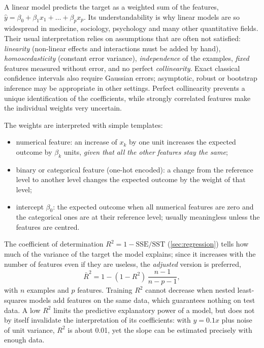 A linear model predicts the target as a weighted sum of the features,
$\hat y=\beta_0+\beta_1x_1+\dots+\beta_px_p$. Its understandability is why linear models are so
widespread in medicine, sociology, psychology and many other quantitative fields. Their usual
interpretation relies on assumptions that are often not satisfied: \emph{linearity} (non-linear
effects and interactions must be added by hand), \emph{homoscedasticity} (constant error variance),
\emph{independence} of the examples, \emph{fixed} features measured without error, and no perfect
\emph{collinearity}. Exact classical confidence intervals also require Gaussian errors; asymptotic, robust or
bootstrap inference may be appropriate in other settings. Perfect collinearity prevents a unique identification
of the coefficients, while strongly correlated features make the individual weights very uncertain.

The weights are interpreted with simple templates:
\begin{itemize}
  \item numerical feature: an increase of $x_k$ by one unit increases the expected outcome by
        $\beta_k$ units, \emph{given that all the other features stay the same};
  \item binary or categorical feature (one-hot encoded): a change from the reference level to
        another level changes the expected outcome by the weight of that level;
  \item intercept $\beta_0$: the expected outcome when all numerical features are zero and the
        categorical ones are at their reference level; usually meaningless unless the features are
        centred.
\end{itemize}
The coefficient of determination $R^2=1-\mathrm{SSE}/\mathrm{SST}$ (\cref{sec:regression}) tells how
much of the variance of the target the model explains; since it increases with the number of
features even if they are useless, the \emph{adjusted} version is preferred,
\begin{equation}
  \bar R^2=1-(1-R^2)\,\frac{n-1}{n-p-1},
\end{equation}
with $n$ examples and $p$ features. Training $R^2$ cannot decrease when nested
least-squares models add features on the same data, which guarantees nothing on test data. A low $R^2$ limits the
predictive explanatory power of a model, but does not by itself invalidate the interpretation of its coefficients:
with $y=0.1x$ plus noise of unit variance, $R^2$ is about 0.01, yet the slope can be estimated precisely with
enough data.

